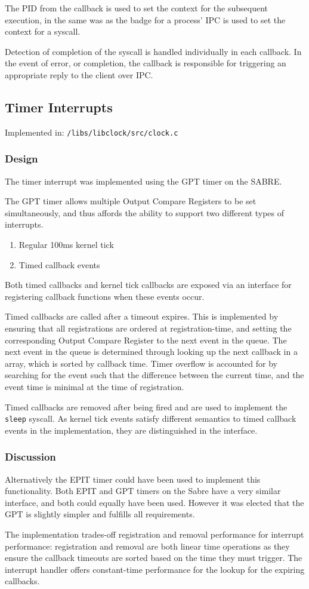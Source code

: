 \documentclass[a4paper,12pt]{article}
\begin{document}
The PID from the callback is used to set the context for the subsequent
execution, in the same was as the badge for a process' IPC is used to set the
context for a syscall.

Detection of completion of the syscall is handled individually in each
callback.  In the event of error, or completion, the callback is responsible
for triggering an appropriate reply to the client over IPC.

\subsection{Timer Interrupts}
Implemented in: \texttt{/libs/libclock/src/clock.c}

\subsubsection{Design}
The timer interrupt was implemented using the GPT timer on the SABRE.

The GPT timer allows multiple Output Compare Registers to be set
simultaneously, and thus affords the ability to support two different types of
interrupts.

\begin{enumerate}
\item Regular 100ms kernel tick
\item Timed callback events
\end{enumerate}

Both timed callbacks and kernel tick callbacks are exposed via an interface
for registering callback functions when these events occur.

Timed callbacks are called after a timeout expires.  This is implemented by
ensuring that all registrations are ordered at registration-time, and setting
the corresponding Output Compare Register to the next event in the queue.  The
next event in the queue is determined through looking up the next callback in
a array, which is sorted by callback time.  Timer overflow is accounted for by
searching for the event such that the difference between the current time, and
the event time is minimal at the time of registration.

Timed callbacks are removed after being fired and are used to implement the
\texttt{sleep} syscall.  As kernel tick events satisfy different semantics to
timed callback events in the implementation, they are distinguished in the
interface.

\subsubsection{Discussion}
Alternatively the EPIT timer could have been used to implement this
functionality.  Both EPIT and GPT timers on the Sabre have a very similar
interface, and both could equally have been used.  However it was elected that
the GPT is slightly simpler and fulfills all requirements.

The implementation trades-off registration and removal performance for
interrupt performance: registration and removal are both linear time
operations as they ensure the callback timeouts are sorted based on the time
they must trigger.  The interrupt handler offers constant-time performance for
the lookup for the expiring callbacks.
\end{document}
